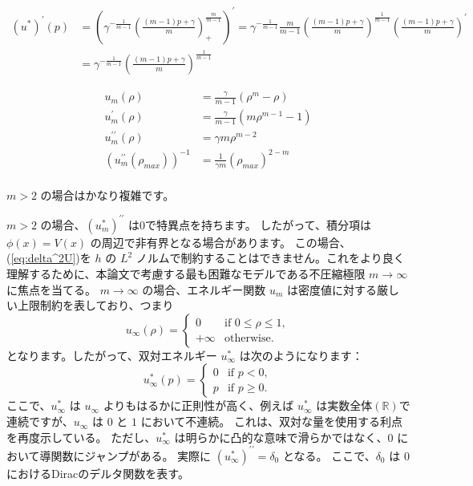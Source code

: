 \documentclass{jsarticle}
\theoremstyle{definition}
\begin{document}
\begin{align*}
    (u^*)^{\prime}(p) &= \left(\gamma^{- \frac{1}{m - 1}} \left( \frac{(m - 1)p + \gamma}{m}\right)_+^{\frac{m}{m-1}}\right)^{\prime}
                        = \gamma^{- \frac{1}{m - 1}} \frac{m}{m - 1} \left( \frac{(m - 1)p + \gamma}{m}\right)^{\frac{1}{m-1}}\left( \frac{(m - 1)p + \gamma}{m}\right)^{\prime}\\
                        &= \gamma^{- \frac{1}{m - 1}} \left( \frac{(m - 1)p + \gamma}{m}\right)^{\frac{1}{m-1}}
\end{align*}
    
\begin{align*}
    u_m(\rho) &= \frac{\gamma}{m - 1}(\rho^m - \rho)\\
    u_m^{\prime}(\rho) &= \frac{\gamma}{m - 1}(m \rho^{m - 1} - 1)\\
    u_m^{\prime\prime}(\rho) &= \gamma m \rho^{m - 2}\\
    (u_m^{\prime\prime}(\rho_{max}))^{-1} &= \frac{1}{\gamma m}(\rho_{max})^{2 - m}\\
\end{align*}

$m > 2$ の場合はかなり複雑です。

$m > 2$ の場合、$(u_m^*)^{\prime\prime}$ は$0$で特異点を持ちます。
したがって、積分項は $\phi(x) = V(x)$ の周辺で非有界となる場合があります。
この場合、(\ref{eq:delta^2U})を $h$ の $L^2$ ノルムで制約することはできません。これをより良く理解するために、本論文で考慮する最も困難なモデルである不圧縮極限 $m \to \infty$ に焦点を当てる。
$m \to \infty$ の場合、エネルギー関数 $u_m$ は密度値に対する厳しい上限制約を表しており、つまり
\[
    u_\infty(\rho) = \begin{cases}
        0 & \text{if } 0 \leq \rho \leq 1, \\
        +\infty & \text{otherwise}.
    \end{cases}
\]
となります。したがって、双対エネルギー $u_\infty^*$ は次のようになります：
\[
    u_\infty^*(p) = \begin{cases}
        0 & \text{if } p < 0, \\ 
        p & \text{if } p \geq 0. 
    \end{cases}
\]
ここで、$u_\infty^*$ は $u_\infty$ よりもはるかに正則性が高く、例えば $u_\infty^*$ は実数全体$(\mathbb{R})$で連続ですが、$u_\infty$ は $0$ と $1$ において不連続。
これは、双対な量を使用する利点を再度示している。
ただし、$u_\infty^*$ は明らかに凸的な意味で滑らかではなく、$0$ において導関数にジャンプがある。
実際に $(u_\infty^*)^{\prime\prime} = \delta_0$ となる。
ここで、$\delta_0$ は $0$ におけるDiracのデルタ関数を表す。\\
\end{document}
